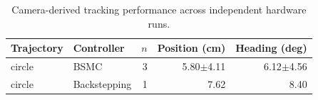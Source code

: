 \begin{table}[!t]
\centering
\caption{Camera-derived tracking performance across independent hardware runs.}
\label{tab:tracking}
\begin{tabular}{llrrr}
\hline
Trajectory & Controller & $n$ & Position (cm) & Heading (deg) \\
\hline
circle & BSMC & 3 & 5.80$\pm$4.11 & 6.12$\pm$4.56 \\
circle & Backstepping & 1 & 7.62 & 8.40 \\
\hline
\end{tabular}
\end{table}
